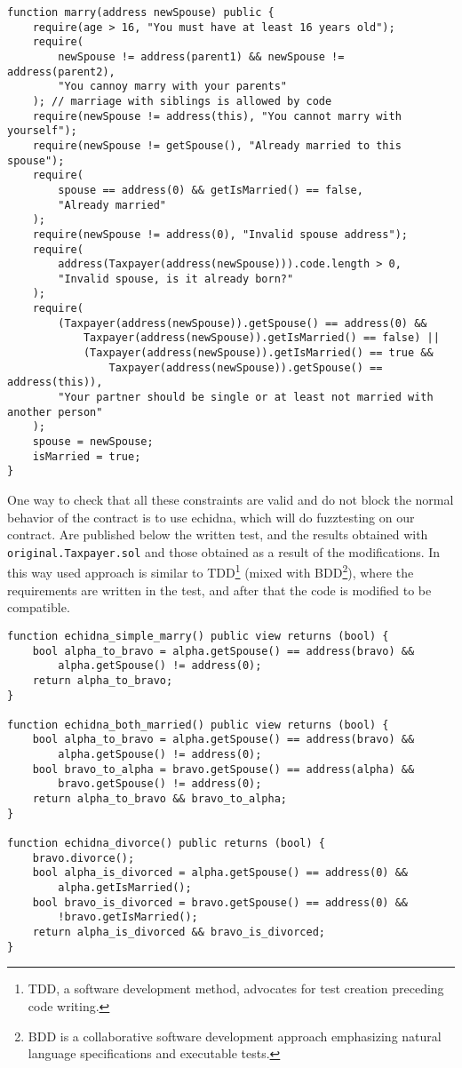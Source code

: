 \documentclass{article}
\begin{document}
\begin{verbatim}
function marry(address newSpouse) public {
    require(age > 16, "You must have at least 16 years old");
    require(
        newSpouse != address(parent1) && newSpouse != address(parent2),
        "You cannoy marry with your parents"
    ); // marriage with siblings is allowed by code
    require(newSpouse != address(this), "You cannot marry with yourself");
    require(newSpouse != getSpouse(), "Already married to this spouse");
    require(
        spouse == address(0) && getIsMarried() == false,
        "Already married"
    );
    require(newSpouse != address(0), "Invalid spouse address");
    require(
        address(Taxpayer(address(newSpouse))).code.length > 0,
        "Invalid spouse, is it already born?"
    );
    require(
        (Taxpayer(address(newSpouse)).getSpouse() == address(0) &&
            Taxpayer(address(newSpouse)).getIsMarried() == false) ||
            (Taxpayer(address(newSpouse)).getIsMarried() == true &&
                Taxpayer(address(newSpouse)).getSpouse() == address(this)),
        "Your partner should be single or at least not married with another person"
    );
    spouse = newSpouse;
    isMarried = true;
}
\end{verbatim}
One way to check that all these constraints are valid and do not block the normal behavior of the contract is to use echidna, which will do fuzztesting on our contract. Are published below the written test, and the results obtained with \texttt{original.Taxpayer.sol} and those obtained as a result of the modifications. In this way used approach is similar to TDD\footnote{TDD, a software development method, advocates for test creation preceding code writing.} (mixed with BDD\footnote{BDD is a collaborative software development approach emphasizing natural language specifications and executable tests.}), where the requirements are written in the test, and after that the code is modified to be compatible.

\begin{verbatim}
function echidna_simple_marry() public view returns (bool) {
    bool alpha_to_bravo = alpha.getSpouse() == address(bravo) &&
        alpha.getSpouse() != address(0);
    return alpha_to_bravo;
}

function echidna_both_married() public view returns (bool) {
    bool alpha_to_bravo = alpha.getSpouse() == address(bravo) &&
        alpha.getSpouse() != address(0);
    bool bravo_to_alpha = bravo.getSpouse() == address(alpha) &&
        bravo.getSpouse() != address(0);
    return alpha_to_bravo && bravo_to_alpha;
}

function echidna_divorce() public returns (bool) {
    bravo.divorce();
    bool alpha_is_divorced = alpha.getSpouse() == address(0) &&
        alpha.getIsMarried();
    bool bravo_is_divorced = bravo.getSpouse() == address(0) &&
        !bravo.getIsMarried();
    return alpha_is_divorced && bravo_is_divorced;
}
\end{verbatim} 
\end{document}
